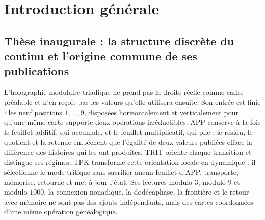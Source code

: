 \chapter*{Introduction générale}
\label{chap:introduccion-general-83}

%
%

\ifdefined\HMTSucesoraStructureTrace
\fi

\section*{Thèse inaugurale : la structure discrète du continu et l'origine commune de ses publications}
\label{sec:tesis-inaugural-helicoidal-hmt-md}

L'holographie modulaire triadique ne prend pas la droite réelle comme cadre préalable et
n'en reçoit pas les valeurs qu'elle utilisera ensuite. Son entrée est finie : les
neuf positions \(1,\ldots,9\), disposées horizontalement et verticalement pour
qu'une même carte supporte deux opérations irréductibles. APP conserve à la
fois le feuillet additif, qui accumule, et le feuillet multiplicatif, qui plie ; le
résidu, le quotient et la retenue empêchent que l'égalité de deux valeurs
publiées efface la différence des histoires qui les ont produites. TRIT
oriente chaque transition et distingue ses régimes. TPK transforme cette
orientation locale en dynamique : il sélectionne le mode tritique sans sacrifier
aucun feuillet d'APP, transporte, mémorise, retourne et met à jour l'état. Ses
lectures modulo \(3\), modulo \(9\) et modulo \(1000\), la connexion nonadique,
la dodécaphase, la frontière et le retour avec mémoire ne sont pas des ajouts
indépendants, mais des cartes coordonnées d'une même opération généalogique.

